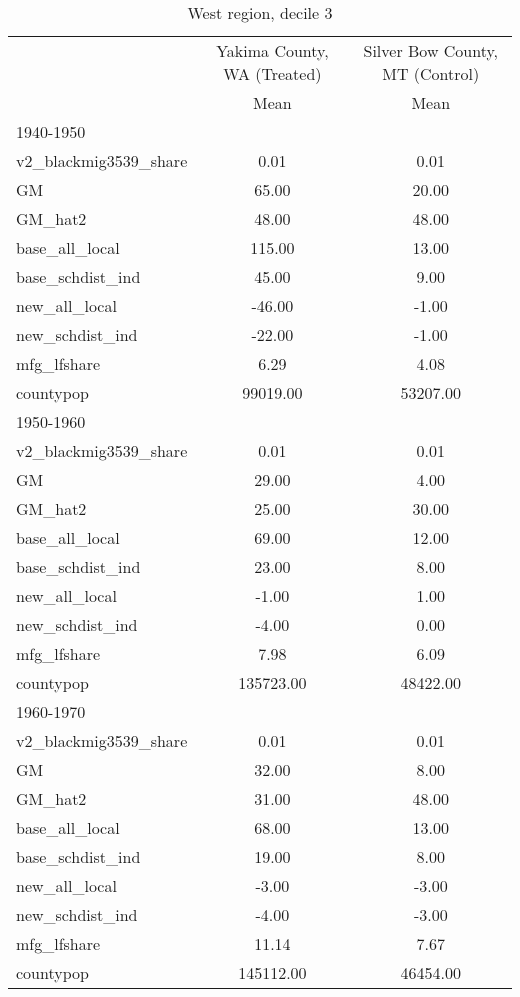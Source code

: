 \begin{table}[htbp]\centering
\def\sym#1{\ifmmode^{#1}\else\(^{#1}\)\fi}
\caption{West region, decile 3 \label{tab1}}
\begin{tabular}{l*{2}{c}}
\toprule
                    &\multicolumn{1}{c}{Yakima County, WA (Treated)}&\multicolumn{1}{c}{Silver Bow County, MT (Control)}\\
                    &        Mean&        Mean\\
\midrule
1940-1950           &            &            \\
v2\_blackmig3539\_share&        0.01&        0.01\\
GM                  &       65.00&       20.00\\
GM\_hat2             &       48.00&       48.00\\
base\_all\_local      &      115.00&       13.00\\
base\_schdist\_ind    &       45.00&        9.00\\
new\_all\_local       &      -46.00&       -1.00\\
new\_schdist\_ind     &      -22.00&       -1.00\\
mfg\_lfshare         &        6.29&        4.08\\
countypop           &    99019.00&    53207.00\\
\midrule
1950-1960           &            &            \\
v2\_blackmig3539\_share&        0.01&        0.01\\
GM                  &       29.00&        4.00\\
GM\_hat2             &       25.00&       30.00\\
base\_all\_local      &       69.00&       12.00\\
base\_schdist\_ind    &       23.00&        8.00\\
new\_all\_local       &       -1.00&        1.00\\
new\_schdist\_ind     &       -4.00&        0.00\\
mfg\_lfshare         &        7.98&        6.09\\
countypop           &   135723.00&    48422.00\\
\midrule
1960-1970           &            &            \\
v2\_blackmig3539\_share&        0.01&        0.01\\
GM                  &       32.00&        8.00\\
GM\_hat2             &       31.00&       48.00\\
base\_all\_local      &       68.00&       13.00\\
base\_schdist\_ind    &       19.00&        8.00\\
new\_all\_local       &       -3.00&       -3.00\\
new\_schdist\_ind     &       -4.00&       -3.00\\
mfg\_lfshare         &       11.14&        7.67\\
countypop           &   145112.00&    46454.00\\
\bottomrule
\end{tabular}
\end{table}
